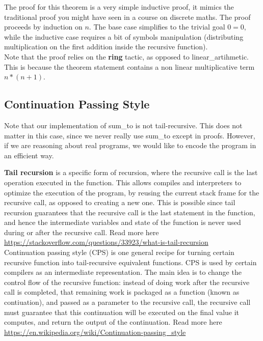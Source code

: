 \documentclass{article}
\begin{document}
The proof for this theorem is a very simple inductive proof, it mimics the traditional proof you might have
seen in a course on discrete maths. The proof proceeds by induction on $n$. The base case simplifies to the trivial
goal $0 = 0$, while the inductive case requires a bit of symbols manipulation (distributing multiplication on the first
addition inside the recursive function). \\

Note that the proof relies on the \textbf{ring} tactic, as opposed to linear\_artihmetic. This is because the
theorem statement contains a non linear multiplicative term $n * (n + 1)$. \\

\subsection{Continuation Passing Style}
Note that our implementation of sum\_to is not tail-recursive. This does not matter in this case, since we never
really use sum\_to except in proofs. However, if we are reasoning about real programs, we would like to encode
the program in an efficient way.

\textbf{Tail recursion} is a specific form of recursion, where the recursive call is the last operation executed
in the function. This allows compiles and interpreters to optimize the execution of the program, by reusing the current 
stack frame for the recursive call, as opposed to creating a new one. This is possible since tail recursion guarantees
that the recursive call is the last statement in the function, and hence the intermediate variables and state of the
function is never used during or after the recursive call. Read more here
\href{https://stackoverflow.com/questions/33923/what-is-tail-recursion}{https://stackoverflow.com/questions/33923/what-is-tail-recursion}\\

Continuation passing style (CPS) is one general recipe for turning certain recursive function into tail-recursive equivalent functions.
CPS is used by certain compilers as an intermediate representation. The main idea is to change the control flow of the
recursive function: instead of doing work after the recursive call is completed, that remaining work is packaged as a function
(known as contiuation), and passed as a parameter to the recursive call, the recursive call must guarantee that this continuation
will be executed on the final value it computes, and return the output of the continuation. Read more here
\href{https://en.wikipedia.org/wiki/Continuation-passing\_style}{https://en.wikipedia.org/wiki/Continuation-passing\_style}\\
\end{document}
